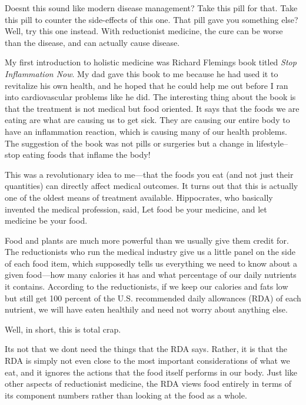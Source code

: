 \documentclass[letterpaper]{article}
\begin{document}
{\color{black}
Doesn{\textquotesingle}t this sound like modern disease management? 
Take this pill for that. Take this pill to counter the side-effects of
this one. That pill gave you something else?  Well, try this one
instead. With reductionist medicine, the cure can be worse than the
disease, and can actually cause disease.}

{\color{black}
 My first introduction to holistic medicine was Richard
Fleming{\textquotesingle}s book titled \textit{Stop Inflammation Now}.
My dad gave this book to me because he had used it to revitalize his
own health, and he hoped that he could help me out before I ran into
cardiovascular problems like he did. The interesting thing about the
book is that the treatment is not medical but food oriented. It says
that the foods we are eating are what are causing us to get sick. They
are causing our entire body to have an inflammation reaction, which is
causing many of our health problems. The suggestion of the book was not
pills or surgeries but a change in lifestyle–stop eating foods that
inflame the body\textcolor[rgb]{0.32941177,0.5529412,0.83137256}{!}}

{\color{black}
This was a revolutionary idea to me—that the foods you eat (and not just
their quantities) can directly affect medical outcomes. It turns out
that this is actually one of the oldest means of treatment available.
Hippocrates, who basically invented the medical profession, said,
{\textquotedbl}Let food be your medicine, and let medicine be your
food.{\textquotedbl}  }

{\color{black}
Food and plants are much more powerful than we usually give them credit
for. The reductionists who run the medical industry give us a little
panel on the side of each food item, which supposedly tells us
everything we need to know about a given food—how many calories it has
and what percentage of our daily nutrients it contains. According to
the reductionists, if we keep our calories and fats low but still get
100 percent of the U.S. recommended daily allowances (RDA) of each
nutrient, we will have eaten healthily and need not worry about
anything else.}

{\color{black}
Well, in short, this is total crap.}

{\color{black}
It{\textquotesingle}s not that we don{\textquotesingle}t need the things
that the RDA says. Rather, it is that the RDA is simply not even close
to the most important considerations of what we eat, and it ignores the
actions that the food itself performs in our body. Just like other
aspects of reductionist medicine, the RDA views food entirely in terms
of its component numbers rather than looking at the food as a whole. }
\end{document}
